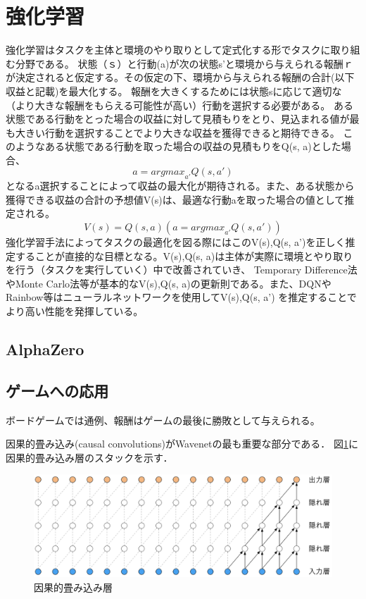 \section{強化学習}
強化学習はタスクを主体と環境のやり取りとして定式化する形でタスクに取り組む分野である。
状態（ｓ）と行動(a)が次の状態s'と環境から与えられる報酬ｒが決定されると仮定する。その仮定の下、環境から与えられる報酬の合計(以下収益と記載)を最大化する。
報酬を大きくするためには状態sに応じて適切な（より大きな報酬をもらえる可能性が高い）行動を選択する必要がある。
ある状態である行動をとった場合の収益に対して見積もりをとり、見込まれる値が最も大きい行動を選択することでより大きな収益を獲得できると期待できる。
このようなある状態である行動を取った場合の収益の見積もりをQ(s, a)とした場合、
\begin{equation}
	a = {argmax}_{a'} Q(s, a')
\end{equation}
となるa選択することによって収益の最大化が期待される。また、ある状態から獲得できる収益の合計の予想値V(s)は、最適な行動aを取った場合の値として推定される。
\begin{equation}
	V(s) = Q(s, a)(a = {argmax}_{a'} Q(s, a'))
\end{equation}
強化学習手法によってタスクの最適化を図る際にはこのV(s),Q(s, a')を正しく推定することが直接的な目標となる。V(s),Q(s, a)は主体が実際に環境とやり取りを行う（タスクを実行していく）中で改善されていき、
Temporary Difference法\cite{oord2016wavenet}やMonte Carlo法\cite{oord2016wavenet}等が基本的なV(s),Q(s, a)の更新則である。また、DQN\cite{oord2016wavenet}やRainbow\cite{oord2016wavenet}等はニューラルネットワークを使用してV(s),Q(s, a')
を推定することでより高い性能を発揮している。
\subsection{AlphaZero}

\subsection{ゲームへの応用}
ボードゲームでは通例、報酬はゲームの最後に勝敗として与えられる。

因果的畳み込み(causal convolutions)がWavenetの最も重要な部分である．
図\ref{fig:ccl}に因果的畳み込み層のスタックを示す．

\begin{figure}[t]
	\centering
	\includegraphics[width=\linewidth]{./figure/ccl.png}
	\caption{因果的畳み込み層}
	\label{fig:ccl}
\end{figure}
